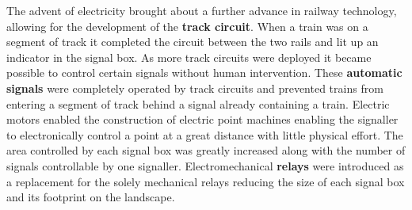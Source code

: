 \begin{comment}
Around about the same time as the introduction of the semaphore signal, the system
for controlling the signals went under drastic change. The Policemen were
replaced with professional \textbf{Signallers} whose job was specifically to
manage the railways. A system of pulleys, wires and levers was also devised
to allow multiple signals and points to be controlled from a central
position. This central position became known as a \textbf{signal box} and was
manned by one or more signallers. This centralisation allowed for further
safety mechanisms to be installed. One in particular, namely the \textbf{interlocking},
is of interest to us. The interlocking physically locked levers if they were
unsafe to move.
\end{comment}
The advent of electricity brought about a further advance in railway technology, allowing for the development of the \textbf{track circuit}. When a train was on a segment of track it completed the circuit between the two rails and lit up an indicator in the signal box. As more track circuits were deployed it became possible to control certain signals without human intervention. These \textbf{automatic signals} were completely operated by track circuits and prevented trains from entering a segment of track behind a signal already containing a train. Electric motors enabled the construction of electric point machines enabling the signaller to electronically control a point at a great distance with little physical effort. The area controlled by each signal box was greatly increased along with the number of signals controllable by one signaller. Electromechanical \textbf{relays} were introduced as a replacement for the solely mechanical relays reducing the size of each signal box and its footprint on the landscape.
\begin{comment}
The next leap in railway technology came from the invention of the electronic
\textbf{track circuit}. These would activate an indicator in the signal box if a
segment of track was occupied by a train. As more and more track circuits
became installed it was no longer necessary to have human intervention to
control certain signals. \textbf{Automatic signals} were introduced which
operated completely by track circuits without any intervention from human
signallers. Around this time \textbf{electric point machines} were introduced
removing a large amount of physical work performed by signallers allowing for
a greater area of control for each signaller.  Around this time
electromechanical \textbf{relays} began to replace purely mechanical relays
reducing the amount of space needed for a signal box.
\end{comment}

